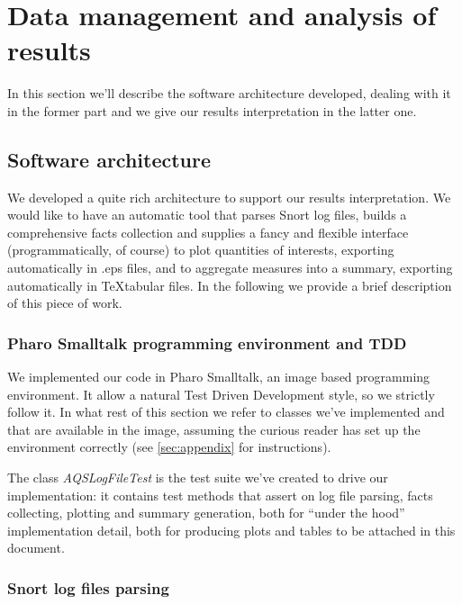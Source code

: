 \documentclass[10pt,a4paper]{article}
\begin{document}
    \newpage
    \section{Data management and analysis of results}
    \label{sec:data-management-result-analysis}

    In this section we'll describe the software architecture
    developed, dealing with it in the former part and we give our
    results interpretation in the latter one.

    \subsection{Software architecture}
    We developed a quite rich architecture to support our results
    interpretation. We would like to have an automatic tool that
    parses Snort log files, builds a comprehensive facts collection
    and supplies a fancy and flexible interface (programmatically, of
    course) to plot quantities of interests, exporting automatically
    in .eps files, and to aggregate measures into a summary, exporting
    automatically in \TeX tabular files. In the following we provide a
    brief description of this piece of work.

    \subsubsection{Pharo Smalltalk programming environment and TDD}
    
    We implemented our code in Pharo Smalltalk, an image based
    programming environment. It allow a natural Test Driven
    Development style, so we strictly follow it. In what rest of this
    section we refer to classes we've implemented and that are
    available in the image, assuming the curious reader has set up the
    environment correctly (see \autoref{sec:appendix} for
    instructions).

    The class \emph{AQSLogFileTest} is the test suite we've created to
    drive our implementation: it contains test methods that assert on
    log file parsing, facts collecting, plotting and summary
    generation, both for ``under the hood'' implementation detail,
    both for producing plots and tables to be attached in this
    document.

    \subsubsection{Snort log files parsing}
\end{document}

